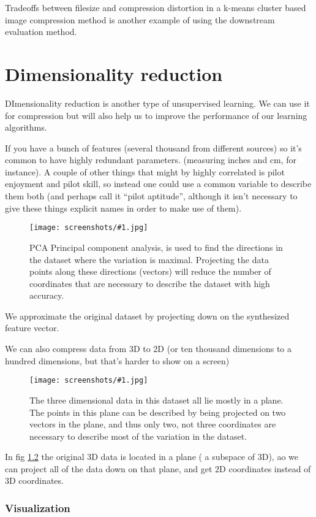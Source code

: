 \documentclass[a4, 12pt, english, USenglish]{scrreprt}
\newcommand{\screenshot}[2]{
\begin{figure}[htb]
\texttt{[image: screenshots/\#1.jpg]}
\label{#1}
\caption{#2}
\end{figure}}
\begin{document}
Tradeoffs between filesize and compression distortion in a k-means
cluster based image compression method  is another example of using
the downstream evaluation method.

\chapter{Dimensionality reduction}

DImensionality reduction is another type of unsupervised learning.
We can use it for compression but will also help us to improve the
performance of our learning algorithms.

If you have a bunch of features (several thousand from different
sources) so it's common to have highly redundant parameters.
(measuring inches and cm, for instance).   A couple of other things that might by
highly correlated is pilot enjoyment and pilot skill, so instead one
could use a common variable to describe them both (and perhaps call it
``pilot aptitude'', although it isn't necessary to give these things
explicit names in order to make use of them).

\screenshot{cpaprojection}{PCA Principal component analysis, is used
  to find the directions in the dataset where the variation is
  maximal.   Projecting the data points along these directions
  (vectors) will reduce the number of coordinates that are necessary
  to describe the dataset with high accuracy.}

We approximate the original dataset by projecting down on the
synthesized feature vector.  


We can also compress data from 3D to 2D (or ten thousand dimensions to
a hundred dimensions, but that's harder to show on a screen)

\screenshot{3dcompression}{The three dimensional data in this dataset
  all lie mostly in a plane. The points in this plane can be described
by being projected on two vectors in the plane, and thus only two, not
three coordinates are necessary to describe most of the variation in
the dataset.}

In fig \ref{3dcompression} the original 3D data is located in a plane
( a subspace of 3D), ao we can project all of the data down on that
plane, and get 2D coordinates instead of 3D coordinates.

\subsection{Visualization}
\end{document}
